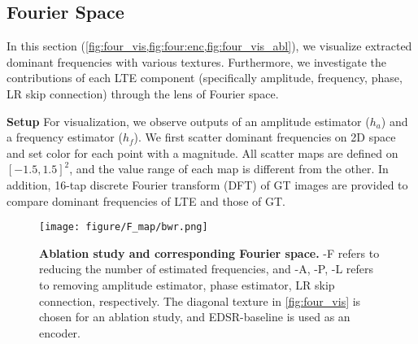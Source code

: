 \documentclass[10pt,twocolumn,letterpaper]{article}
\begin{document}
\subsection{Fourier Space}
\label{sec:fourier}
In this section (\cref{fig:four_vis,fig:four:enc,fig:four_vis_abl}), we visualize extracted dominant frequencies with various textures. Furthermore, we investigate the contributions of each LTE component (specifically amplitude, frequency, phase, LR skip connection) through the lens of Fourier space.

\textbf{Setup} For visualization, we observe outputs of an amplitude estimator ($h_a$) and a frequency estimator ($h_f$). We first scatter dominant frequencies on 2D space and set color for each point with a magnitude. All scatter maps are defined on $[-1.5,1.5]^2$, and the value range of each map is different from the other. In addition, 16-tap discrete Fourier transform (DFT) of GT images are provided to compare dominant frequencies of LTE and those of GT.

\begin{figure}[t]
\footnotesize
\centering
{}
\texttt{[image: figure/F\_map/bwr.png]}
\vspace*{-6pt}
\caption{\textbf{Ablation study and corresponding Fourier space.} -F refers to reducing the number of estimated frequencies, and -A, -P, -L refers to removing amplitude estimator, phase estimator, LR skip connection, respectively. The diagonal texture in \cref{fig:four_vis} is chosen for an ablation study, and EDSR-baseline \cite{Lim_2017_CVPR_Workshops} is used as an encoder.}
\label{fig:four_vis_abl}
\end{figure}
\end{document}
